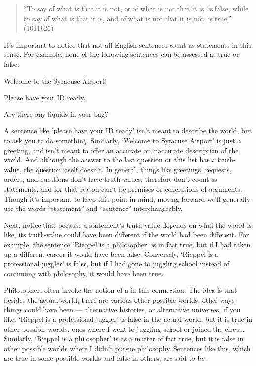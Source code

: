 \begin{quote}
``To say of what is that it is not, or of what is not that it is, is false, while to say of what is that it is, and of what is not that it is not, is true.'' (1011b25)
\end{quote}

It's important to notice that not all English sentences count as statements in this sense.  For example, none of the following sentences can be assessed as true or false:

\begin{ebullet}
\item Welcome to the Syracuse Airport! 
\item Please have your ID ready.
\item Are there any liquids in your bag?
\end{ebullet}

A sentence like `please have your ID ready' isn't meant to describe the world, but to ask you to do something.  Similarly, `Welcome to Syracuse Airport' is just a greeting, and isn't meant to offer an accurate or inaccurate description of the world.  And although the answer to the last question on this list has a truth-value, the question itself doesn't.  In general, things like greetings, requests, orders, and questions don't have truth-values, therefore don't count as statements, and for that reason can't be premises or conclusions of arguments.  Though it's important to keep this point in mind, moving forward we'll generally use the words ``statement'' and ``sentence'' interchangeably.


Next, notice that because a statement's truth value depends on what the world is like, its truth-value could have been different if the world had been different.  For example, the sentence `Rieppel is a philosopher' is in fact true, but if I had taken up a different career it would have been false.  Conversely, `Rieppel is a professional juggler' is false, but if I had gone to juggling school instead of continuing with philosophy, it would have been true.   

Philosophers often invoke the notion of a  in this connection.  The idea is that besides the actual world, there are various other possible worlds, other ways things could have been --- alternative histories, or alternative universes, if you like.  `Rieppel is a professional juggler' is false in the actual world, but it is true in other possible worlds, ones where I went to juggling school or joined the circus.  Similarly, `Rieppel is a philosopher' is as a matter of fact true, but it is false in other possible worlds where I didn't pursue philosophy.  Sentences like this, which are true in some possible worlds and false in others, are said to be .

